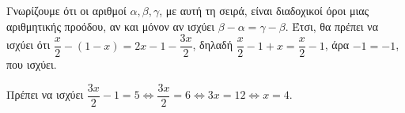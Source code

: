 
\begin{alist}
\item Γνωρίζουμε ότι οι αριθμοί $\alpha, \beta, \gamma$, με αυτή τη σειρά, είναι διαδοχικοί όροι μιας αριθμητικής προόδου, αν και μόνον αν ισχύει $\beta - \alpha = \gamma - \beta$. Έτσι, θα πρέπει να ισχύει ότι
$\dfrac{x}{2} - (1 - x) = 2x - 1 - \dfrac{3x}{2}$, δηλαδή $\dfrac{x}{2} - 1 + x = \dfrac{x}{2} - 1$, άρα $-1 = -1$, που ισχύει.

\item Πρέπει να ισχύει $\dfrac{3x}{2} - 1 = 5 \Leftrightarrow \dfrac{3x}{2} = 6 \Leftrightarrow 3x = 12 \Leftrightarrow x = 4$.
\end{alist}

